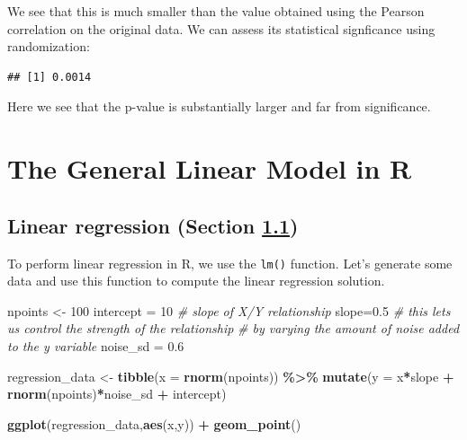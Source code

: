 \documentclass[
  12pt,
]{book}
\newenvironment{Shaded}{\begin{snugshade}}{\end{snugshade}}
\newcommand{\AttributeTok}[1]{\textcolor[rgb]{0.13,0.29,0.53}{#1}}
\newcommand{\CommentTok}[1]{\textcolor[rgb]{0.56,0.35,0.01}{\textit{#1}}}
\newcommand{\DecValTok}[1]{\textcolor[rgb]{0.00,0.00,0.81}{#1}}
\newcommand{\FloatTok}[1]{\textcolor[rgb]{0.00,0.00,0.81}{#1}}
\newcommand{\FunctionTok}[1]{\textcolor[rgb]{0.13,0.29,0.53}{\textbf{#1}}}
\newcommand{\NormalTok}[1]{#1}
\newcommand{\OtherTok}[1]{\textcolor[rgb]{0.56,0.35,0.01}{#1}}
\newcommand{\SpecialCharTok}[1]{\textcolor[rgb]{0.81,0.36,0.00}{\textbf{#1}}}
\begin{document}
We see that this is much smaller than the value obtained using the Pearson correlation on the original data. We can assess its statistical signficance using randomization:

\begin{verbatim}
## [1] 0.0014
\end{verbatim}

Here we see that the p-value is substantially larger and far from significance.

\hypertarget{the-general-linear-model-in-r}{%
\chapter{The General Linear Model in R}\label{the-general-linear-model-in-r}}

\hypertarget{linear-regression}{%
\section{Linear regression (Section \ref{linear-regression})}\label{linear-regression}}

To perform linear regression in R, we use the \texttt{lm()} function. Let's generate some data and use this function to compute the linear regression solution.

\begin{Shaded}
\begin{Highlighting}[]
\NormalTok{npoints }\OtherTok{\textless{}{-}} \DecValTok{100}
\NormalTok{intercept }\OtherTok{=} \DecValTok{10}
\CommentTok{\# slope of X/Y relationship}
\NormalTok{slope}\OtherTok{=}\FloatTok{0.5}
\CommentTok{\# this lets us control the strength of the relationship}
\CommentTok{\# by varying the amount of noise added to the y variable}
\NormalTok{noise\_sd }\OtherTok{=} \FloatTok{0.6}

\NormalTok{regression\_data }\OtherTok{\textless{}{-}} \FunctionTok{tibble}\NormalTok{(}\AttributeTok{x =} \FunctionTok{rnorm}\NormalTok{(npoints)) }\SpecialCharTok{\%\textgreater{}\%}
  \FunctionTok{mutate}\NormalTok{(}\AttributeTok{y =}\NormalTok{ x}\SpecialCharTok{*}\NormalTok{slope }\SpecialCharTok{+} \FunctionTok{rnorm}\NormalTok{(npoints)}\SpecialCharTok{*}\NormalTok{noise\_sd }\SpecialCharTok{+}\NormalTok{ intercept)}

\FunctionTok{ggplot}\NormalTok{(regression\_data,}\FunctionTok{aes}\NormalTok{(x,y)) }\SpecialCharTok{+} 
  \FunctionTok{geom\_point}\NormalTok{()}
\end{Highlighting}
\end{Shaded}
\end{document}
